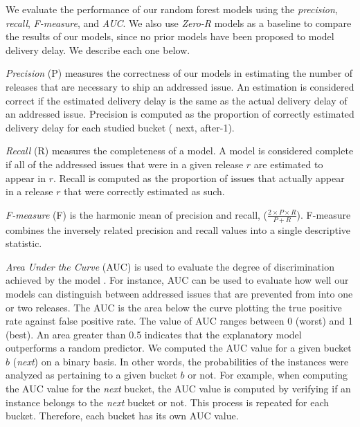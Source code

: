 We evaluate the performance of our random forest models using the
\textit{precision}, \textit{recall}, \textit{F-measure}, and \textit{AUC}. We
also use \textit{Zero-R} models as a baseline to compare the results of our
models, since no prior models have been proposed to model delivery delay. We
describe each one below.

\textit{Precision} (P) measures the correctness of our models in estimating the
number of releases that are necessary to ship an addressed issue. An estimation is
considered correct if the estimated delivery delay is the same as the actual
delivery delay of an addressed issue. Precision is computed as the proportion of
correctly estimated delivery delay for each studied \DIFdelbegin {}\DIFdelend \DIFaddbegin {}\DIFaddend bucket (\eg
next, after-1).

\textit{Recall} (R) measures the completeness of a model. A model is considered
complete if all of the addressed issues that were \DIFdelbegin {}\DIFdelend \DIFaddbegin {}\DIFaddend in a given release
\(r\) are estimated to appear in \(r\).  Recall is computed as the proportion of
issues that actually appear in a release \(r\) that were correctly estimated as
such.

\textit{F-measure} (F) is the harmonic mean of precision and recall, (\ie $\frac
{2 \times P \times R}{P + R}$). F-measure combines the inversely related
precision and recall values into a single descriptive statistic. 

\textit{Area Under the Curve} (AUC) is used to evaluate the degree of
discrimination achieved by the model \cite{hanley1982meaning}. For instance, AUC
can be used to evaluate how well our models can distinguish between addressed issues
that are prevented from \DIFdelbegin {}\DIFdelend \DIFaddbegin {}\DIFaddend into one or two releases. The AUC is the
area below the curve plotting the true positive rate against false positive
rate. The value of AUC ranges between 0 (worst) and 1 (best). An area greater
than 0.5 indicates that the explanatory model outperforms a random predictor. We
computed the AUC value for a given bucket \(b\) (\eg \textit{next}) on a binary
basis. In other words, the probabilities of the instances were analyzed as
pertaining to a given bucket \(b\) or not. For example, when computing the AUC
value for the \textit{next} bucket, the AUC value is computed by verifying if an
instance belongs to the \textit{next} bucket or not. This process is repeated
for each bucket. Therefore, each bucket has its own AUC value.  

